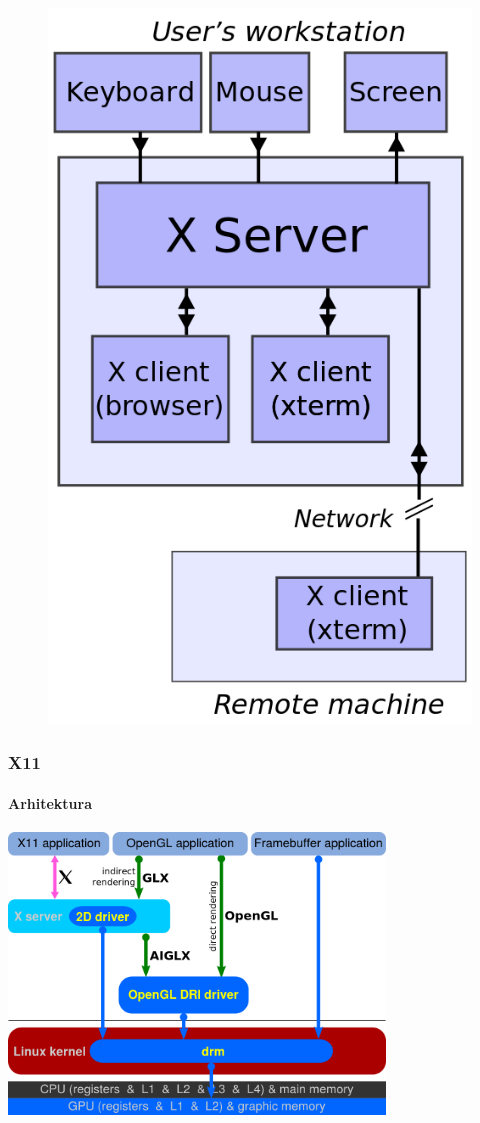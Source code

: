 \documentclass[t,table,usenames,dvipsnames]{beamer}
\begin{document}
\begin{frame}
\begin{figure}
\begin{minipage}{0.25\textwidth}
			\includegraphics[width=\linewidth]{server_client.png}
		\end{minipage}
	\end{figure}
\end{frame}


\begin{frame}
	\frametitle{X11}
	\framesubtitle{Arhitektura}
	\centering
	\includegraphics[width=0.75\textwidth]{graphics.png}
\end{frame}
\end{document}
